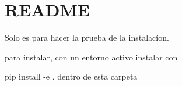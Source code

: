 \chapter{README}
\hypertarget{md_dirac__solver_2README}{}\label{md_dirac__solver_2README}
Solo es para hacer la prueba de la instalacíon.

para instalar, con un entorno activo instalar con

pip install -\/e . dentro de esta carpeta 